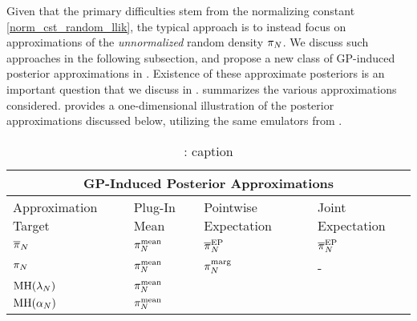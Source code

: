 \documentclass[12pt]{article}
\begin{document}
Given that the primary difficulties stem from the normalizing constant
\ref{norm_cst_random_llik}, the typical approach is to instead focus on approximations of the \textit{unnormalized}
random density $\llikEmRdm[\Ndesign]{\postDens}$. We discuss such approaches in the following subsection, and 
propose a new class of GP-induced posterior approximations in . 
Existence of these approximate posteriors is an important question that we discuss in . 
 summarizes the various approximations considered.  provides a 
one-dimensional illustration of the posterior approximations discussed below, utilizing the same emulators 
from .

\begin{table}[h!]
\centering
\begin{tabular}{ |p{3cm}||p{3cm}|p{3cm}|p{3cm}|  } 
 \hline
 \multicolumn{4}{|c|}{GP-Induced Posterior Approximations} \\
 \hline
 Approximation Target& Plug-In Mean & Pointwise Expectation & Joint Expectation\\
 \hline
 $\llikEmRdm[\Ndesign]{\postDensNorm}$ & $\llikEmMeanDens[\Ndesign]$ & 
 	$\llikEmSampDensNorm[\Ndesign]$ & $\llikEmSampDensNorm[\Ndesign]$ \\
 $\llikEmRdm[\Ndesign]{\postDens}$& $\llikEmMeanDens[\Ndesign]$ & $\llikEmMargDens[\Ndesign]$   &-\\
 $\textrm{MH}(\Em[\Ndesign]{\likRatio})$ & $\llikEmMeanDens[\Ndesign]$ & &  \\
  $\textrm{MH}(\Em[\Ndesign]{\accProbMH})$ & $\llikEmMeanDens[\Ndesign]$ & &  \\
 \hline
\end{tabular} 
\caption{\todo: caption}
\label{tbl:post-approx}
\end{table}
\end{document}
